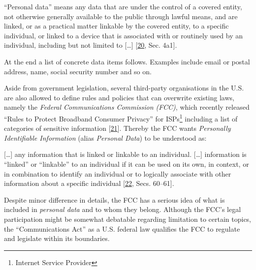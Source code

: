 \documentclass[12pt,english,a4paper,titlepage,cleardoublepage=empty,dottedtoc]{report}
\let\origquote\quote
\let\endorigquote\endquote
\renewenvironment{quote}{%
    \origquote
    \itshape
}
{\endorigquote}
\begin{document}
\begin{quote}
``Personal data'' means any data that are under the control of a covered
entity, not otherwise generally available to the public through lawful
means, and are linked, or as a practical matter linkable by the covered
entity, to a specific individual, or linked to a device that is
associated with or routinely used by an individual, including but not
limited to {[}\ldots{}{]}
{[}\protect\hyperlink{ref-bill-draft_2015_us_consumer-privacy-bill-of-rights-act_definition}{20},
Sec. 4a1{]}.
\end{quote}

At the end a list of concrete data items follows. Examples include email
or postal address, name, social security number and so on.

Aside from government legislation, several third-party organisations in
the U.S. are also allowed to define rules and policies that can
overwrite existing laws, namely the \emph{Federal Communications
Commission (FCC)}, which recently released ``Rules to Protect Broadband
Consumer Privacy'' for ISPs\footnote{Internet Service Provider}
including a list of categories of sensitive information
{[}\protect\hyperlink{ref-rules_2016_fcc_to-protect-broadband-consumer-privacy_sensitive-types-of-data}{21}{]}.
Thereby the FCC wants \emph{Personally Identifiable Information} (alias
\emph{Personal Data}) to be understood as:

\begin{quote}
{[}\ldots{}{]} any information that is linked or linkable to an
individual. {[}\ldots{}{]} information is ``linked'' or ``linkable'' to
an individual if it can be used on its own, in context, or in
combination to identify an individual or to logically associate with
other information about a specific individual
{[}\protect\hyperlink{ref-rules_2016_fcc_to-protect-broadband-consumer-privacy_personally-identifiable-information}{22},
Secs. 60--61{]}.
\end{quote}

Despite minor difference in details, the FCC has a serious idea of what
is included in \emph{personal data} and to whom they belong. Although
the FCC's legal participation might be somewhat debatable regarding
limitation to certain topics, the ``Communications Act'' as a U.S.
federal law qualifies the FCC to regulate and legislate within its
boundaries.
\end{document}
